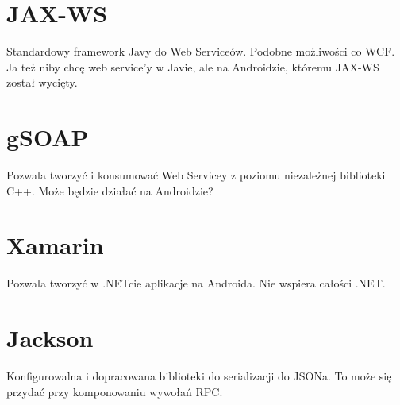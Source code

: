 \section{JAX-WS}
Standardowy framework Javy do Web Serviceów. Podobne możliwości co WCF. Ja też niby chcę web service'y w Javie, ale na Androidzie, któremu JAX-WS został wycięty.

\section{gSOAP}
Pozwala tworzyć i konsumować Web Servicey z poziomu niezależnej biblioteki C++. Może będzie działać na Androidzie?

\section{Xamarin}
Pozwala tworzyć w .NETcie aplikacje na Androida. Nie wspiera całości .NET.


\section{Jackson}
Konfigurowalna i dopracowana biblioteki do serializacji do JSONa. To może się przydać przy komponowaniu wywołań RPC.

%

